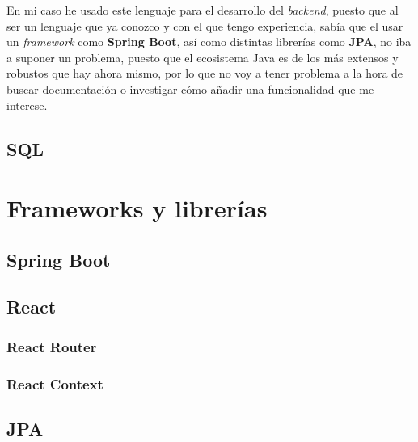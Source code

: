  En mi caso he usado este lenguaje para el desarrollo del \textit{backend}, puesto que al ser un lenguaje que ya conozco y con el que tengo experiencia, sabía 	que el usar un \textit{framework} como \textbf{Spring Boot}, así como distintas librerías como \textbf{JPA}, no iba a suponer un problema, puesto que el ecosistema Java es de los más extensos y robustos que hay ahora mismo, por lo que no voy a tener problema a la hora de buscar documentación o investigar cómo añadir una funcionalidad que me interese.

\subsection{SQL}


\section{Frameworks y librerías}


\subsection{Spring Boot}


\subsection{React}


\subsubsection{React Router}


\subsubsection{React Context}


\subsection{JPA}


